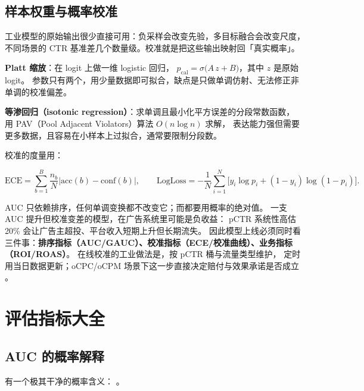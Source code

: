 \subsection{样本权重与概率校准}
\label{sec:calibration}

工业模型的原始输出很少直接可用：负采样会改变先验，多目标融合会改变尺度，
不同场景的 CTR 基准差几个数量级。校准就是把这些输出映射回「真实概率」。

\textbf{Platt 缩放}：在 logit 上做一维 logistic 回归，
$p_{\text{cal}} = \sigma\big(A\, z + B\big)$，其中 $z$ 是原始 logit。
参数只有两个，用少量数据即可拟合，缺点是只做单调仿射、无法修正非单调的校准偏差。

\textbf{等渗回归（isotonic regression）}：求单调且最小化平方误差的分段常数函数，
用 PAV（Pool Adjacent Violators）算法 $O(n\log n)$ 求解，
表达能力强但需要更多数据，且容易在小样本上过拟合，通常要限制分段数。

校准的度量用：

\begin{equation}
\text{ECE} = \sum_{b=1}^{B}\frac{n_b}{N}\Big|\text{acc}(b) - \text{conf}(b)\Big| ,
\qquad
\text{LogLoss} = -\frac{1}{N}\sum_{i=1}^{N}\Big[y_i\log p_i + (1-y_i)\log(1-p_i)\Big] .
\label{eq:calibration}
\end{equation}

\begin{insight}
AUC 只依赖排序，任何单调变换都不改变它；而都要用概率的绝对值。
一支 AUC 提升但校准变差的模型，在广告系统里可能是负收益：
pCTR 系统性高估 20\% 会让广告主超投、平台收入短期上升但长期流失。
因此模型上线必须同时看三件事：\textbf{排序指标（AUC/GAUC）、校准指标（ECE/校准曲线）、业务指标（ROI/ROAS）}。
在线校准的工业做法是，按 pCTR 桶与流量类型维护，
定时用当日数据更新；oCPC/oCPM 场景下这一步直接决定赔付与效果承诺是否成立 \cite{zhang2016ocpc}。
\end{insight}

\section{评估指标大全}

\subsection{AUC 的概率解释}

 有一个极其干净的概率含义：
。

